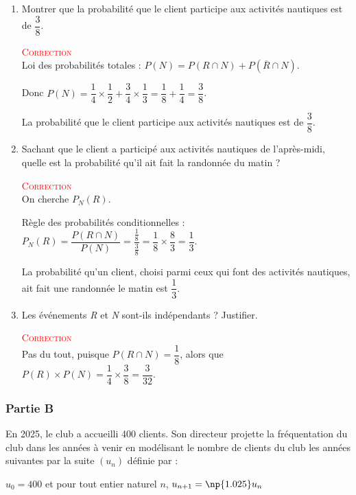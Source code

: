 \begin{enumerate}
		\item Montrer que la probabilité que le client participe aux activités nautiques est de \mbox{$\dfrac38$}.

				\textcolor{red}{\textsc{Correction}}\\
				Loi des probabilités totales : \mbox{$P(N)=P(R\cap N)+P(\overline{R}\cap N)$}.

				Donc \mbox{$P(N)=\dfrac14\times\dfrac12+\dfrac34\times\dfrac13=\dfrac18+\dfrac14=\dfrac38$}.

				La  probabilité que le client participe aux activités nautiques est de \mbox{$\dfrac38$}.

\item Sachant que le client a participé aux activités nautiques de l'après-midi, quelle est la probabilité qu'il ait fait la randonnée du matin ?

				\textcolor{red}{\textsc{Correction}}\\

				On cherche \mbox{$P_N (R)$}.

				Règle des probabilités conditionnelles : \mbox{$P_N (R)=\dfrac{P(R \cap N)}{P(N)}=\dfrac{\frac18}{\frac38}=\dfrac18\times\dfrac83=\dfrac13$}.

				La probabilité qu'un client, choisi parmi ceux qui font des activités nautiques, ait fait une randonnée le matin est $\dfrac13$.
		\item Les événements \textit{R} et \textit{N} sont-ils indépendants ? Justifier.

						\textcolor{red}{\textsc{Correction}}\\
						Pas du tout, puisque \mbox{$P(R \cap N)=\dfrac18$}, alors que \mbox{$P(R)\times P(N)=\dfrac14\times\dfrac38=\dfrac{3}{32}$}.
	\end{enumerate}
\subsubsection*{Partie B}
En 2025, le club a accueilli 400 clients. Son directeur projette la fréquentation du club dans les années à venir en modélisant le nombre de clients du club les années suivantes par la suite \mbox{$(u_n)$} définie par :

\begin{center}
	\mbox{$u_0=400$} et pour tout entier naturel $n$, \mbox{$u_{n+1}=\np{1.025}u_n$}
\end{center}

